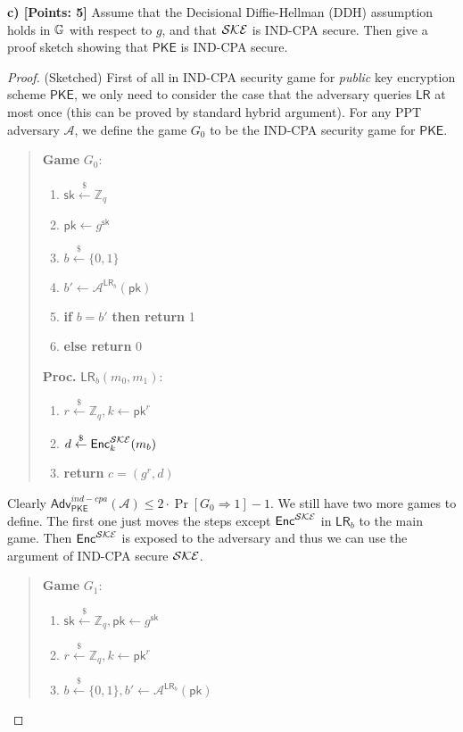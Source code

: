 \documentclass[12pt]{article}
\newcommand{\Z}{\mathbb{Z}}
\newcommand{\bits}{\{0,1\}}
\newcommand{\getsr}{\stackrel{\$}{\gets}}
\newcommand{\Adv}{\textsf{Adv}}
\theoremstyle{definition}
\newcommand{\PKE}{\textsf{PKE}}
\newcommand{\Enc}{\textsf{Enc}}
\newcommand{\pk}{\textsf{pk}}
\newcommand{\sk}{\textsf{sk}}
\newcommand{\A}{\mathcal{A}}
\newcommand{\LR}{\textsf{LR}}
\begin{document}
{\bf c) [Points: 5]} Assume that the Decisional Diffie-Hellman (DDH) assumption holds in $\mathbb{G}$ with respect to $g$, and that $\mathcal{SKE}$ is IND-CPA secure. Then give a proof sketch showing that $\PKE$ is IND-CPA secure.
\begin{proof}
(Sketched) First of all in IND-CPA security game for \emph{public} key encryption scheme $\PKE$, we only need to consider the case that the adversary queries $\LR$ at most once (this can be proved by standard hybrid argument). For any PPT adversary $\A$, we define the game $G_0$ to be the IND-CPA security game for $\PKE$.
\begin{quote}
\begin{minipage}[t]{0.4\textwidth}
{\bf Game} $G_0$:
\begin{enumerate}
\item $\sk \getsr \Z_q$
\item $\pk \gets g^\sk$
\item $b \getsr \bits$
\item $b' \gets \A^{\LR_b}(\pk)$
\item {\bf if} $b=b'$ {\bf then return} 1
\item {\bf else return} 0
\end{enumerate}
\end{minipage}
\begin{minipage}[t]{0.4\textwidth}
{\bf Proc.} $\LR_b(m_0, m_1)$:
\begin{enumerate}
\item $r \getsr \Z_q, k \gets \pk^r$
\item $d \getsr \Enc_k^\SKE(m_b)$
\item {\bf return} $c=(g^r,d)$
\end{enumerate}
\end{minipage}
\end{quote}
Clearly $\Adv_{\PKE}^{ind-cpa}(\A) \leq 2\cdot \Pr[G_0 \Rightarrow 1]-1$.
We still have two more games to define.
The first one just moves the steps except $\Enc^\SKE$ in $\LR_b$ to the main game. Then $\Enc^\SKE$ is exposed to the adversary and thus we can use the argument of IND-CPA secure $\mathcal{SKE}$.
\begin{quote}
\begin{minipage}[t]{0.4\textwidth}
{\bf Game} $G_1$:
\begin{enumerate}
\item $\sk \getsr \Z_q, \pk \gets g^\sk$
\item $r \getsr \Z_q, k \gets \pk^r$
\item $b \getsr \bits, b' \gets \A^{\LR_b}(\pk)$

\end{enumerate}
\end{minipage}
\end{quote}
\end{proof}
\end{document}
